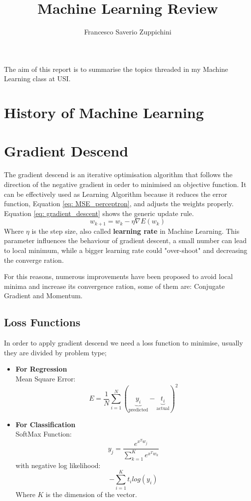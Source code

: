 \documentclass[11pt]{article}
\title{Machine Learning Review}
\author{Francesco Saverio Zuppichini}
\begin{document}
\maketitle
The aim of this report is to summarise the topics threaded in my Machine Learning class at USI.
\section{History of Machine Learning}

\section{Gradient Descend}
The gradient descend is an iterative optimisation algorithm that follows the direction of the negative gradient in order to minimised an objective function. It can be effectively used as Learning Algorithm because it reduces the error function, Equation \ref{eq: MSE_perceptron}, and adjusts the weights properly. Equation \ref{eq: gradient_descent} shows the generic update rule.
\begin{equation}
	w_{k + 1} = w_k - \eta \nabla E(w_k)
	\label{eq: gradient_descent}
\end{equation}
Where $\eta$ is the step size, also called \textbf{learning rate} in Machine Learning. This parameter influences the behaviour of gradient descent, a small number can lead to local minimum, while a bigger learning rate could "over-shoot" and decreasing the converge ration. 

For this reasons, numerous improvements have been proposed to avoid local minima and increase its convergence ration, some of them are: Conjugate Gradient and Momentum.
\subsection{Loss Functions}
In order to apply gradient descend we need a loss function to minimise, usually they are divided by problem type;

\begin{itemize}
	\item \textbf{For Regression} \\
	Mean Square Error: \\
	\begin{equation}
	E = \frac{1}{N}\sum_{i=1}^N(\underbrace{y_i}_{\text{predicted}} - \underbrace{t_i}_{\text{actual}})^2
	\label{eq: MSE}	
	\end{equation}
	\item \textbf{For Classification} \\
	SoftMax Function:
	\begin{equation}
	y_j = \frac{e^{x^Tw_j}}{\sum_{k = 1}^K e^{x^Tw_k}}
	\label{eq: soft_max}	
	\end{equation}
	with negative log likelihood:\\
	\begin{equation}
	- \sum_{i = 1}^K t_ilog(y_i)
	\label{eq: log_like}
	\end{equation}
	Where $K$ is the dimension of the vector.

\end{itemize}
\end{document}
